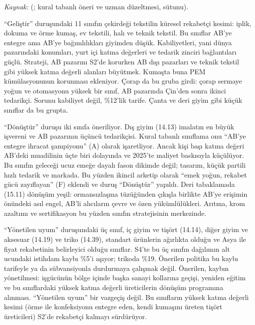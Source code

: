 \endgroup

\emph{Kaynak:}  (; kural tabanlı öneri ve uzman düzeltmesi,  sütunu).

``Geliştir'' duruşundaki 11 sınıfın çekirdeği tekstilin küresel rekabetçi kesimi: iplik, dokuma ve örme kumaş, ev tekstili, halı ve teknik tekstil. Bu sınıflar AB'ye entegre ama AB'ye bağımlılıkları giyimden düşük. Kabiliyetleri, yani dünya pazarındaki konumları, yurt içi katma değerleri ve tedarik zinciri bağlantıları güçlü. Strateji, AB pazarını S2'de korurken AB dışı pazarları ve teknik tekstil gibi yüksek katma değerli alanları büyütmek. Kumaşta buna PEM kümülasyonunun korunması ekleniyor. Çorap da bu gruba girdi: çorap sermaye yoğun ve otomasyonu yüksek bir sınıf, AB pazarında Çin'den sonra ikinci tedarikçi. Sorunu kabiliyet değil, \%12'lik tarife. Çanta ve deri giyim gibi küçük sınıflar da bu grupta.

``Dönüştür'' duruşu iki sınıfa öneriliyor. Dış giyim (14.13) imalatın en büyük işvereni ve AB pazarının üçüncü tedarikçisi. Kural tabanlı sınıflama onu ``AB'ye entegre ihracat şampiyonu'' (A) olarak işaretliyor. Ancak kişi başı katma değeri AB'deki muadilinin üçte biri dolayında ve 2025'te maliyet baskısıyla küçülüyor. Bu sınıfın geleceği ucuz emeğe dayalı fason dikimde değil; tasarım, küçük partili hızlı tedarik ve markada. Bu yüzden ikincil arketip olarak ``emek yoğun, rekabet gücü zayıflayan'' (F) eklendi ve duruş ``Dönüştür'' yapıldı. Deri tabaklamada (15.11) dönüşüm yeşil: ormansızlaşma tüzüğünden çıkışla birlikte AB'ye erişimin önündeki asıl engel, AB'li alıcıların çevre ve özen yükümlülükleri. Arıtma, krom azaltımı ve sertifikasyon bu yüzden sınıfın stratejisinin merkezinde.

``Yönetilen uyum'' duruşundaki üç sınıf, iç giyim ve tişört (14.14), diğer giyim ve aksesuar (14.19) ve triko (14.39), standart ürünlerin ağırlıkta olduğu ve Asya ile fiyat rekabetinin belirleyici olduğu sınıflar. S4'te bu üç sınıfın dağılımın alt ucundaki istihdam kaybı \%5'i aşıyor; trikoda \%19. Önerilen politika bu kaybı tarifeyle ya da sübvansiyonla durdurmaya çalışmak değil. Önerilen, kaybın yönetilmesi: işgücünün bölge içinde başka sanayi kollarına geçişi, yeniden eğitim ve bu sınıflardaki yüksek katma değerli üreticilerin dönüşüm programına alınması. ``Yönetilen uyum'' bir vazgeçiş değil. Bu sınıfların yüksek katma değerli kesimi (örme ile konfeksiyonu entegre eden, kendi kumaşını üreten tişört üreticileri) S2'de rekabetçi kalmayı sürdürüyor.

